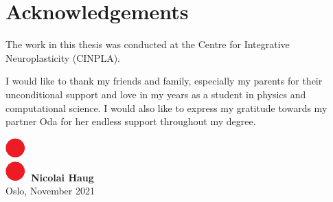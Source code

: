 \chapter*{Acknowledgements}
\thispagestyle{plain}

The work in this thesis was conducted at the Centre for Integrative Neuroplasticity (CINPLA).




I would like to thank my friends and family, especially my parents for their unconditional support and love in my years as a student in physics and computational science. I would also like to express my gratitude towards my partner Oda for her endless support throughout my degree. 
\\ [8 pt]

\begin{flushright}
\includegraphics[height = 1.5ex]{latex/latex-report/3_Images/Logo/UiO/uio-colon.pdf}\, \textbf{Nicolai Haug}
\\
Oslo, November 2021
\end{flushright}
